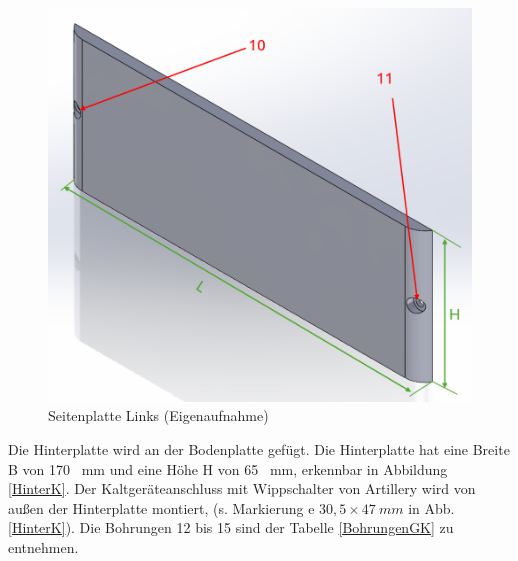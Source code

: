 \begin{figure}[H]
	\begin{center}
		\includegraphics[width=\textwidth]{Images/Konstruktion/SeiteLK.png}
		\caption{Seitenplatte Links (Eigenaufnahme)} \label{SeiteLK}
	\end{center}
\end{figure}

Die Hinterplatte wird an der Bodenplatte gefügt. Die Hinterplatte hat eine Breite B von 170 \ mm und eine Höhe H von 65 \ mm, erkennbar in Abbildung \ref{HinterK}. Der Kaltgeräteanschluss mit Wippschalter von Artillery wird von außen der Hinterplatte montiert, (s. Markierung e $30,5 \times 47 \ mm$  in Abb.\ref{HinterK}). Die Bohrungen 12 bis 15 sind der Tabelle \ref{BohrungenGK} zu entnehmen.

